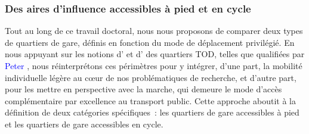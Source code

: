 \begin{refsegment}
\subsubsection*{Des aires d'influence accessibles à pied et en cycle
    \label{chap3:quartiers-gare-taille}
    }

Tout au long de ce travail doctoral, nous nous proposons de comparer deux types de quartiers de gare, définis en fonction du mode de déplacement privilégié. En nous appuyant sur les notions d’ et d’ des quartiers \acrshort{TOD}, telles que qualifiées par \textcolor{blue}{Peter} \textcolor{blue}{\textcite[60]{calthorpe_next_1993}}, nous réinterprétons ces périmètres pour y intégrer, d’une part, la mobilité individuelle légère au cœur de nos problématiques de recherche, et d’autre part, pour les mettre en perspective avec la marche, qui demeure le mode d’accès complémentaire par excellence au transport public. Cette approche aboutit à la définition de deux catégories spécifiques~: les quartiers de gare accessibles à pied et les quartiers de gare accessibles en cycle.%


\end{refsegment}
